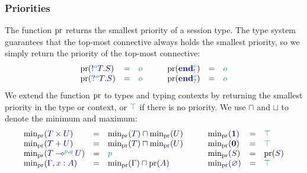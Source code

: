 \documentclass[main.tex]{subfiles}
\begin{document}
\subsubsection*{Priorities}
The function $\operatorname{pr}$ returns the smallest priority of a session type. The type system guarantees that the top-most connective always holds the smallest priority, so we simply return the priority of the top-most connective:
\[
\begin{array}{lcl}
  \pr(\ty{\tysend[\cs{o}]{T}{S}})            & = & \cs{o} \\
  \pr(\ty{\tyrecv[\cs{o}]{T}{S}})            & = & \cs{o} \\
\end{array}
\qquad
\begin{array}{lcl}
  \pr(\ty{\tyends[\cs{o}]})                  & = & \cs{o} \\
  \pr(\ty{\tyendr[\cs{o}]})                  & = & \cs{o} \\
\end{array}
\]
We extend the function $\operatorname{pr}$ to types and typing contexts by returning the smallest priority in the type or context, or $\cs{\top}$ if there is no priority. We use $\sqcap$ and $\sqcup$ to denote the minimum and maximum:
\[
\begin{array}{lcl}
  \minpr(\ty{\typrod{T}{U}})                 & = & \minpr({\ty{T}})\sqcap\minpr({\ty{U}}) \\
  \minpr(\ty{\tysum{T}{U}})                  & = & \minpr({\ty{T}})\sqcap\minpr({\ty{U}}) \\
  \minpr(\ty{\tylolli[\cs{p},\cs{q}]{T}{U}}) & = & \cs{p} \\
  \minpr(\ty{\Gamma}, \tmty{x}{A})           & = & \minpr(\ty{\Gamma})\sqcap\pr(\ty{A})
\end{array}
\qquad
\begin{array}{lcl}
  \minpr(\ty{\tyunit})                       & = & \ptop \\
  \minpr(\ty{\tyvoid})                       & = & \ptop \\
  \minpr(\ty{S})                             & = & \pr(\ty{S}) \\
  \minpr(\ty{\emptyenv})                     & = & \ptop
\end{array}
\]
\end{document}
